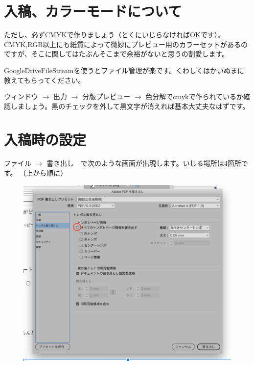 \documentclass[dvipdfmx,jb5]{jreport}
\begin{document}
\section{入稿、カラーモードについて}
ただし、必ずCMYKで作りましょう（とくにいじらなければOKです）。CMYK,RGB以上にも紙質によって微妙にプレビュー用のカラーセットがあるのですが、そこに関してはたぶんそこまで余裕がないと思うの割愛します。

GoogleDriveFileStreamを使うとファイル管理が楽です。くわしくはかいぬまに教えてもらってください。

ウィンドウ $\rightarrow$ 出力 $\rightarrow$ 分版プレビュー $\rightarrow$ 色分解でcmykで作られているか確認しましょう。黒のチェックを外して黒文字が消えれば基本大丈夫なはずです。


\section{入稿時の設定}
ファイル $\rightarrow$ 書き出し　で次のような画面が出現します。いじる場所は4箇所です。
（上から順に）
\begin{figure}[H]
      \includegraphics[scale=0.7]{assets/pmh1.png}
\end{figure}
\end{document}

